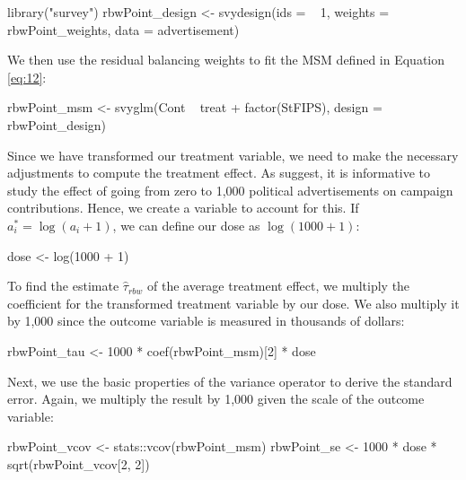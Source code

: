 \begin{Schunk}
\begin{Sinput}
library("survey")
rbwPoint_design <- svydesign(ids = ~ 1,
                             weights = ~ rbwPoint_weights,
                             data = advertisement)
\end{Sinput}
\end{Schunk}

We then use the residual balancing weights to fit the MSM defined in
Equation \ref{eq:12}:

\begin{Schunk}
\begin{Sinput}
rbwPoint_msm <- svyglm(Cont ~ treat + factor(StFIPS),
                       design = rbwPoint_design)
\end{Sinput}
\end{Schunk}

Since we have transformed our treatment variable, we need to make the
necessary adjustments to compute the treatment effect. As
\citet{urbanDollarsSidewalkShould2014a} suggest, it is informative to
study the effect of going from zero to 1,000 political advertisements on
campaign contributions. Hence, we create a  variable to
account for this. If \(a_{i}^{*}=\log(a_{i}+1)\), we can define our dose
as \(\log(1000+1)\):

\begin{Schunk}
\begin{Sinput}
dose <- log(1000 + 1)
\end{Sinput}
\end{Schunk}

To find the estimate \(\hat{\tau}_{rbw}\) of the average treatment
effect, we multiply the coefficient for the transformed treatment
variable by our dose. We also multiply it by 1,000 since the outcome
variable is measured in thousands of dollars:

\begin{Schunk}
\begin{Sinput}
rbwPoint_tau <- 1000 * coef(rbwPoint_msm)[2] * dose
\end{Sinput}
\end{Schunk}

Next, we use the basic properties of the variance operator to derive the
standard error. Again, we multiply the result by 1,000 given the scale
of the outcome variable:

\begin{Schunk}
\begin{Sinput}
rbwPoint_vcov <- stats::vcov(rbwPoint_msm)
rbwPoint_se <- 1000 * dose * sqrt(rbwPoint_vcov[2, 2])
\end{Sinput}
\end{Schunk}

